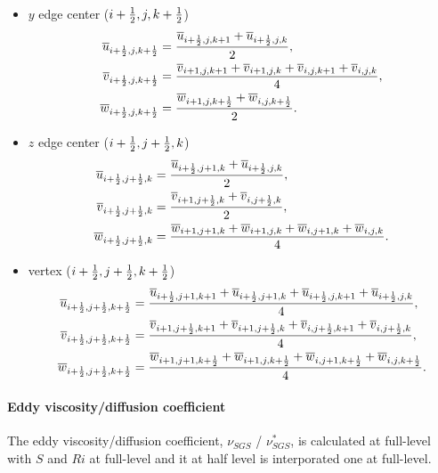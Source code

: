 \begin{itemize}
  \item $y$ edge center ($i+\half,j,k+\half$)
    \begin{align}
      \overline{u}_{i+\half,j,k+\half} &=
      \frac{\overline{u}_{i+\half,j,k+1}+\overline{u}_{i+\half,j,k}}{2}, \\
      \overline{v}_{i+\half,j,k+\half} &=
      \frac{\overline{v}_{i+1,j,k+1}+\overline{v}_{i+1,j,k}+\overline{v}_{i,j,k+1}+\overline{v}_{i,j,k}}{4}, \\
      \overline{w}_{i+\half,j,k+\half} &=
      \frac{\overline{w}_{i+1,j,k+\half}+\overline{w}_{i,j,k+\half}}{2}.
    \end{align}

  \item $z$ edge center ($i+\half,j+\half,k$)
    \begin{align}
      \overline{u}_{i+\half,j+\half,k} &=
      \frac{\overline{u}_{i+\half,j+1,k}+\overline{u}_{i+\half,j,k}}{2}, \\
      \overline{v}_{i+\half,j+\half,k} &=
      \frac{\overline{v}_{i+1,j+\half,k}+\overline{v}_{i,j+\half,k}}{2}, \\
      \overline{w}_{i+\half,j+\half,k} &=
      \frac{\overline{w}_{i+1,j+1,k}+\overline{w}_{i+1,j,k}+\overline{w}_{i,j+1,k}+\overline{w}_{i,j,k}}{4}.
    \end{align}

  \item vertex ($i+\half,j+\half,k+\half$)
    \begin{align}
      \overline{u}_{i+\half,j+\half,k+\half} &=
      \frac{\overline{u}_{i+\half,j+1,k+1}+\overline{u}_{i+\half,j+1,k}+\overline{u}_{i+\half,j,k+1}+\overline{u}_{i+\half,j,k}}{4}, \\
      \overline{v}_{i+\half,j+\half,k+\half} &=
      \frac{\overline{v}_{i+1,j+\half,k+1}+\overline{v}_{i+1,j+\half,k}+\overline{v}_{i,j+\half,k+1}+\overline{v}_{i,j+\half,k}}{4}, \\
      \overline{w}_{i+\half,j+\half,k+\half} &=
      \frac{\overline{w}_{i+1,j+1,k+\half}+\overline{w}_{i+1,j,k+\half}+\overline{w}_{i,j+1,k+\half}+\overline{w}_{i,j,k+\half}}{4}.
    \end{align}
\end{itemize}

\paragraph{Eddy viscosity/diffusion coefficient}
The eddy viscosity/diffusion coefficient, $\nu_{SGS}$ / $\nu^*_{SGS}$, is calculated at full-level with $S$ and $Ri$ at full-level and it at half level is interporated one at full-level.


